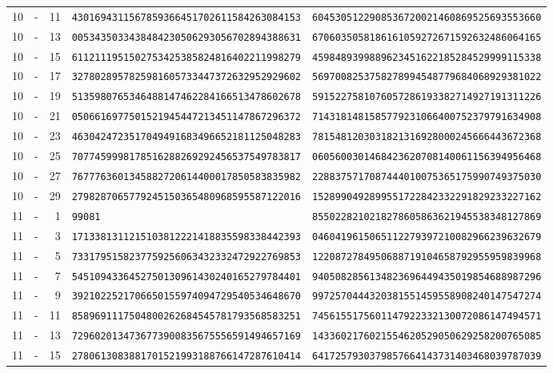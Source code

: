\begin{longtable}{@{}rcrll@{}}
10&-&11&\texttt{4301694311567859366451702611584263084153}&\texttt{6045305122908536720021460869525693553660}\\
10&-&13&\texttt{0053435033438484230506293056702894388631}&\texttt{6706035058186161059272671592632486064165}\\
10&-&15&\texttt{6112111951502753425385824816402211998279}&\texttt{4598489399889623451622185284529999115338}\\
10&-&17&\texttt{3278028957825981605733447372632952929602}&\texttt{5697008253758278994548779684068929381022}\\
10&-&19&\texttt{5135980765346488147462284166513478602678}&\texttt{5915227581076057286193382714927191311226}\\
10&-&21&\texttt{0506616977501521945447213451147867296372}&\texttt{7143181481585779231066400752379791634908}\\
10&-&23&\texttt{4630424723517049491683496652181125048283}&\texttt{7815481203031821316928000245666443672368}\\
10&-&25&\texttt{7077459998178516288269292456537549783817}&\texttt{0605600301468423620708140061156394956468}\\
10&-&27&\texttt{7677763601345882720614400017850583835982}&\texttt{2288375717087444010075365175990749375030}\\
10&-&29&\texttt{2798287065779245150365480968595587122016}&\texttt{1528990492899551722842332291829233227162}\\
11&-&1&\texttt{99081}&\texttt{8550228210218278605863621945538348127869}\\
11&-&3&\texttt{1713381311215103812221418835598338442393}&\texttt{0460419615065112279397210082966239632679}\\
11&-&5&\texttt{7331795158237759256063432332472922769853}&\texttt{1220872784950688719104658792955959839968}\\
11&-&7&\texttt{5451094336452750130961430240165279784401}&\texttt{9405082856134823696449435019854688987296}\\
11&-&9&\texttt{3921022521706650155974094729540534648670}&\texttt{9972570444320381551459558908240147547274}\\
11&-&11&\texttt{8589691117504800262684545781793568583251}&\texttt{7456155175601147922332130072086147494571}\\
11&-&13&\texttt{7296020134736773900835675556591494657169}&\texttt{1433602176021554620529050629258200765085}\\
11&-&15&\texttt{2780613083881701521993188766147287610414}&\texttt{6417257930379857664143731403468039787039}\\

\end{longtable}
